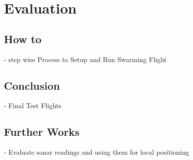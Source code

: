 \chapter{Evaluation}\label{ch:conclusion}

\section{How to}
- step wise Process to Setup and Run Swarming Flight

\section{Conclusion}
- Final Test Flights

\section{Further Works}
- Evaluate sonar readings and using them for local positioning 